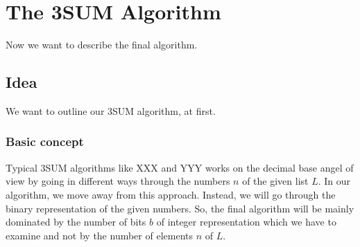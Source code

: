 \documentclass{article}
\newtheorem*{theorem A}{Theorem A}
\newtheorem*{theorem B}{N\"olker's Theorem}
\theoremstyle{remark}
\theoremstyle{remark}
\begin{document}
\section{The 3SUM Algorithm}
\label{s:the3sumalgorithm}
Now we want to describe the final algorithm.
\subsection{Idea}
\label{ss:idea}
We want to outline our 3SUM algorithm, at first.
\subsubsection{Basic concept}
\label{sss:basicconcept}
Typical 3SUM algorithms like XXX \cite{A} and YYY \cite{B} works on the decimal base angel of view by going in different ways through the numbers $n$ of the given list $L$. In our algorithm, we move away from this approach. Instead, we will go through the binary representation of the given numbers. So, the final algorithm will be mainly dominated by the number of bits $b$ of integer representation which we have to examine and not by the number of elements $n$ of $L$.\\
\end{document}
